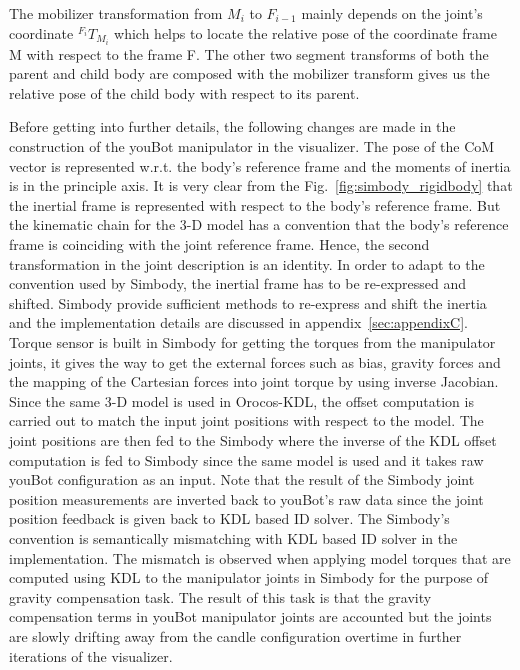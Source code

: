 The mobilizer transformation from $M_i$ to $F_{i-1}$ mainly depends on the joint's coordinate $^{F_i}T_{M_i}$ which helps to locate the relative pose of the coordinate frame M with respect to the frame F. The other two segment transforms of both the parent and child body are composed with the mobilizer transform gives us the relative pose of the child body with respect to its parent. 

Before getting into further details, the following changes are made in the construction of the youBot manipulator in the visualizer. The pose of the CoM vector is represented w.r.t. the body's reference frame and the moments of inertia is in the principle axis. It is very clear from the Fig.~\ref{fig:simbody_rigidbody} that the inertial frame is represented with respect to the body's reference frame. But the kinematic chain for the 3-D model has a convention that the body's reference frame is coinciding with the joint reference frame. Hence, the second transformation in the joint description is an identity. In order to adapt to the convention used by Simbody, the inertial frame has to be re-expressed and shifted. Simbody provide sufficient methods to re-express and shift the inertia and the implementation details are discussed in appendix~\ref{sec:appendixC}. Torque sensor is built in Simbody for getting the torques from the manipulator joints, it gives the way to get the external forces such as bias, gravity forces and the mapping of the Cartesian forces into joint torque by using inverse Jacobian. Since the same 3-D model is used in Orocos-KDL, the offset computation is carried out to match the input joint positions with respect to the model. The joint positions are then fed to the Simbody where the inverse of the KDL offset computation is fed to Simbody since the same model is used and it takes raw youBot configuration as an input. Note that the result of the Simbody joint position measurements are inverted back to youBot's raw data since the joint position feedback is given back to KDL based ID solver. The Simbody's convention is semantically mismatching with KDL based ID solver in the implementation. The mismatch is observed when applying model torques that are computed using KDL to the manipulator joints in Simbody for the purpose of gravity compensation task. The result of this task is that the gravity compensation terms in youBot manipulator joints are accounted but the joints are slowly drifting away from the candle configuration overtime in further iterations of the visualizer. 

\newpage
